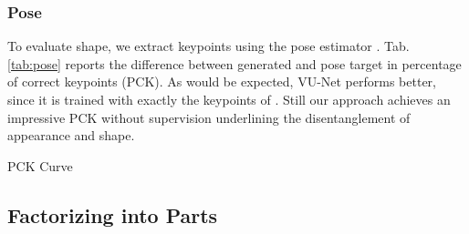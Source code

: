 	\subsubsection{Pose}
	To evaluate shape, we extract keypoints using the pose estimator \cite{cao17affinityfield}. Tab. \ref{tab:pose} reports the difference between generated and pose target in percentage of correct keypoints (PCK). As would be expected, VU-Net performs better, since it is trained with exactly the keypoints of \cite{cao17affinityfield}. Still our approach achieves an impressive PCK without supervision underlining the disentanglement of appearance and shape.


	PCK Curve
	\subsection{Factorizing into Parts}
